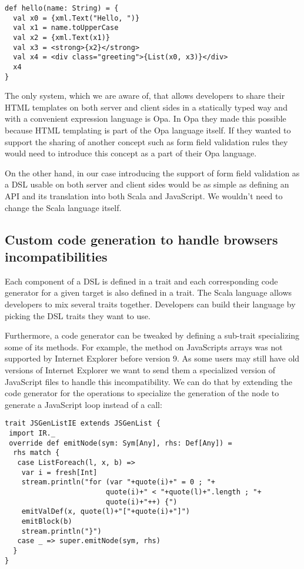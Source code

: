 \documentclass[american,english,runningheads]{llncs}
\begin{document}
\begin{lstlisting}
def hello(name: String) = {
  val x0 = {xml.Text("Hello, ")}
  val x1 = name.toUpperCase
  val x2 = {xml.Text(x1)}
  val x3 = <strong>{x2}</strong>
  val x4 = <div class="greeting">{List(x0, x3)}</div>
  x4
}
\end{lstlisting}

The only system, which we are aware of, that allows developers to share their HTML templates on both server and client sides in a statically typed way and with a convenient expression language is Opa. In Opa they made this possible because HTML templating is part of the Opa language itself. If they wanted to support the sharing of another concept such as form field validation rules they would need to introduce this concept as a part of their Opa language.

On the other hand, in our case introducing the support of form field validation as a DSL usable on both server and client sides would be as simple as defining an API and its translation into both Scala and JavaScript. We wouldn’t need to change the Scala language itself.

\subsection{Custom code generation to handle browsers incompatibilities}

Each component of a DSL is defined in a trait and each corresponding code generator for a given target is also defined in a trait. The Scala language allows developers to mix several traits together. Developers can build their language by picking the DSL traits they want to use.

Furthermore, a code generator can be tweaked by defining a sub-trait specializing some of its methods. For example, the  method on JavaScripts arrays was not supported by Internet Explorer before version 9. As some users may still have old versions of Internet Explorer we want to send them a specialized version of JavaScript files to handle this incompatibility. We can do that by extending the code generator for the  operations to specialize the generation of the  node to generate a JavaScript  loop instead of a  call:

\begin{lstlisting}
trait JSGenListIE extends JSGenList {
 import IR._
 override def emitNode(sym: Sym[Any], rhs: Def[Any]) =
  rhs match {
   case ListForeach(l, x, b) =>
    var i = fresh[Int]
    stream.println("for (var "+quote(i)+" = 0 ; "+
                        quote(i)+" < "+quote(l)+".length ; "+
                        quote(i)+"++) {")
    emitValDef(x, quote(l)+"["+quote(i)+"]")
    emitBlock(b)
    stream.println("}")
   case _ => super.emitNode(sym, rhs)
  }
}
\end{lstlisting}
\end{document}
